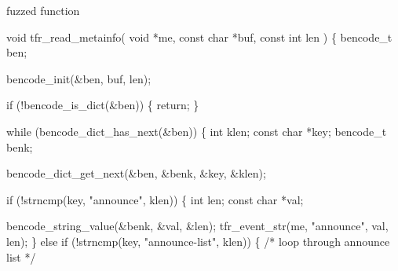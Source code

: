 \documentclass[
  a4paper,
]{scrreprt}
\newenvironment{Shaded}{\begin{snugshade}}{\end{snugshade}}
\newcommand{\CommentTok}[1]{\textcolor[rgb]{0.41,0.41,0.41}{#1}}
\newcommand{\ControlFlowTok}[1]{\textcolor[rgb]{0.85,0.12,0.09}{#1}}
\newcommand{\DataTypeTok}[1]{\textcolor[rgb]{0.47,0.16,0.63}{#1}}
\newcommand{\NormalTok}[1]{\textcolor[rgb]{0.33,0.33,0.33}{#1}}
\newcommand{\OperatorTok}[1]{\textcolor[rgb]{0.00,0.46,0.62}{#1}}
\newcommand{\StringTok}[1]{\textcolor[rgb]{0.00,0.50,0.00}{#1}}
\theoremstyle{definition}
\theoremstyle{remark}
\begin{document}
fuzzed function

\begin{Shaded}
\begin{Highlighting}[numbers=left,,]
\DataTypeTok{void}\NormalTok{ tfr\_read\_metainfo}\OperatorTok{(}
    \DataTypeTok{void} \OperatorTok{*}\NormalTok{me}\OperatorTok{,}
    \DataTypeTok{const} \DataTypeTok{char} \OperatorTok{*}\NormalTok{buf}\OperatorTok{,}
    \DataTypeTok{const} \DataTypeTok{int}\NormalTok{ len}
\OperatorTok{)}
\OperatorTok{\{}
\NormalTok{    bencode\_t ben}\OperatorTok{;}

\NormalTok{    bencode\_init}\OperatorTok{(\&}\NormalTok{ben}\OperatorTok{,}\NormalTok{ buf}\OperatorTok{,}\NormalTok{ len}\OperatorTok{);}

    \ControlFlowTok{if} \OperatorTok{(!}\NormalTok{bencode\_is\_dict}\OperatorTok{(\&}\NormalTok{ben}\OperatorTok{))}
    \OperatorTok{\{}
        \ControlFlowTok{return}\OperatorTok{;}
    \OperatorTok{\}}

    \ControlFlowTok{while} \OperatorTok{(}\NormalTok{bencode\_dict\_has\_next}\OperatorTok{(\&}\NormalTok{ben}\OperatorTok{))}
    \OperatorTok{\{}
        \DataTypeTok{int}\NormalTok{ klen}\OperatorTok{;}
        \DataTypeTok{const} \DataTypeTok{char} \OperatorTok{*}\NormalTok{key}\OperatorTok{;}
\NormalTok{        bencode\_t benk}\OperatorTok{;}

\NormalTok{        bencode\_dict\_get\_next}\OperatorTok{(\&}\NormalTok{ben}\OperatorTok{,} \OperatorTok{\&}\NormalTok{benk}\OperatorTok{,} \OperatorTok{\&}\NormalTok{key}\OperatorTok{,} \OperatorTok{\&}\NormalTok{klen}\OperatorTok{);}

        \ControlFlowTok{if} \OperatorTok{(!}\NormalTok{strncmp}\OperatorTok{(}\NormalTok{key}\OperatorTok{,} \StringTok{"announce"}\OperatorTok{,}\NormalTok{ klen}\OperatorTok{))}
        \OperatorTok{\{}
            \DataTypeTok{int}\NormalTok{ len}\OperatorTok{;}
            \DataTypeTok{const} \DataTypeTok{char} \OperatorTok{*}\NormalTok{val}\OperatorTok{;}

\NormalTok{            bencode\_string\_value}\OperatorTok{(\&}\NormalTok{benk}\OperatorTok{,} \OperatorTok{\&}\NormalTok{val}\OperatorTok{,} \OperatorTok{\&}\NormalTok{len}\OperatorTok{);}
\NormalTok{            tfr\_event\_str}\OperatorTok{(}\NormalTok{me}\OperatorTok{,} \StringTok{"announce"}\OperatorTok{,}\NormalTok{ val}\OperatorTok{,}\NormalTok{ len}\OperatorTok{);}
        \OperatorTok{\}}
        \ControlFlowTok{else} \ControlFlowTok{if} \OperatorTok{(!}\NormalTok{strncmp}\OperatorTok{(}\NormalTok{key}\OperatorTok{,} \StringTok{"announce{-}list"}\OperatorTok{,}\NormalTok{ klen}\OperatorTok{))}
        \OperatorTok{\{}
            \CommentTok{/*  loop through announce list */}


\end{Highlighting}
\end{Shaded}
\end{document}
